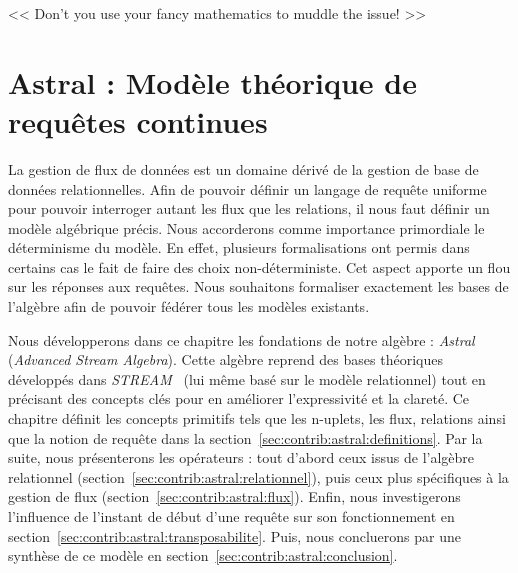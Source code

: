 \begin{savequote}[6cm]
<< Don't you use your fancy mathematics to muddle the issue! >>
\end{savequote}

\chapter{Astral : Modèle théorique de requêtes continues}\label{chap:contrib:astral}
\chaptertoc

La gestion de flux de données est un domaine dérivé de la gestion de base de données relationnelles. Afin de pouvoir définir un langage de requête uniforme pour pouvoir interroger autant les flux que les relations, il nous faut définir un modèle algébrique précis. Nous accorderons comme importance primordiale le déterminisme du modèle. En effet, plusieurs formalisations ont permis dans certains cas le fait de faire des choix non-déterministe. Cet aspect apporte un flou sur les réponses aux requêtes. Nous souhaitons formaliser exactement les bases de l'algèbre afin de pouvoir fédérer tous les modèles existants.

Nous développerons dans ce chapitre les fondations de notre algèbre : \textit{Astral} (\textit{Advanced Stream Algebra}). Cette algèbre reprend des bases théoriques développés dans \textit{STREAM}~\cite{Arasu:stream} (lui même basé sur le modèle relationnel) tout en précisant des concepts clés pour en améliorer l'expressivité et la clareté. Ce chapitre définit les concepts primitifs tels que les n-uplets, les flux, relations ainsi que la notion de requête dans la section~\ref{sec:contrib:astral:definitions}. Par la suite, nous présenterons les opérateurs : tout d'abord ceux issus de l'algèbre relationnel (section~\ref{sec:contrib:astral:relationnel}), puis ceux plus spécifiques à la gestion de flux (section~\ref{sec:contrib:astral:flux}). Enfin, nous investigerons l'influence de l'instant de début d'une requête sur son fonctionnement en section~\ref{sec:contrib:astral:transposabilite}. Puis, nous concluerons par une synthèse de ce modèle en section~\ref{sec:contrib:astral:conclusion}.






